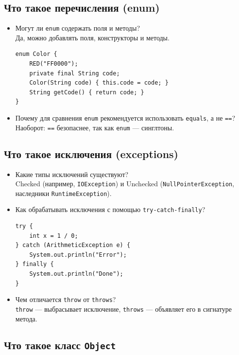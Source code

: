 \documentclass[a4paper,14pt]{article}
\begin{document}
\subsection{Что такое перечисления (enum)}

\begin{itemize}
    \item Могут ли \texttt{enum} содержать поля и методы? \\
    Да, можно добавлять поля, конструкторы и методы.
    \begin{lstlisting}[style=javastyle]
enum Color {
    RED("FF0000");
    private final String code;
    Color(String code) { this.code = code; }
    String getCode() { return code; }
}
    \end{lstlisting}
    \item Почему для сравнения \texttt{enum} рекомендуется использовать \texttt{equals}, а не \texttt{==}? \\
    Наоборот: \texttt{==} безопаснее, так как \texttt{enum} — синглтоны.
\end{itemize}

\subsection{Что такое исключения (exceptions)}

\begin{itemize}
    \item Какие типы исключений существуют? \\
    Checked (например, \texttt{IOException}) и Unchecked (\texttt{NullPointerException}, наследники \texttt{RuntimeException}).
    \item Как обрабатывать исключения с помощью \texttt{try-catch-finally}? \\
    \begin{lstlisting}[style=javastyle]
try {
    int x = 1 / 0;
} catch (ArithmeticException e) {
    System.out.println("Error");
} finally {
    System.out.println("Done");
}
    \end{lstlisting}
    \item Чем отличается \texttt{throw} от \texttt{throws}? \\
    \texttt{throw} — выбрасывает исключение, \texttt{throws} — объявляет его в сигнатуре метода.
\end{itemize}
\subsection{Что такое класс \texttt{Object}}
\end{document}
